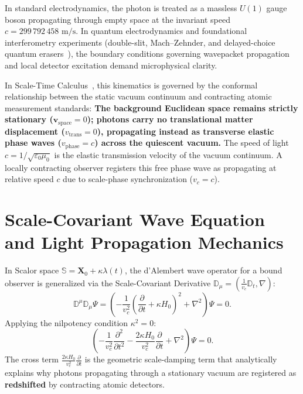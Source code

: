 \documentclass[11pt,a4paper]{article}
\begin{document}
In standard electrodynamics, the photon is treated as a massless $U(1)$ gauge boson propagating through empty space at the invariant speed $c = 299\,792\,458\text{ m/s}$. In quantum electrodynamics and foundational interferometry experiments (double-slit, Mach--Zehnder, and delayed-choice quantum erasers~\cite{scully1982,kim2000}), the boundary conditions governing wavepacket propagation and local detector excitation demand microphysical clarity.

In Scale-Time Calculus~\cite{scale_calculus}, this kinematics is governed by the conformal relationship between the static vacuum continuum and contracting atomic measurement standards: \textbf{The background Euclidean space remains strictly stationary ($\mathbf{v}_{\mathrm{space}} = 0$); photons carry no translational matter displacement ($v_{\mathrm{trans}} = 0$), propagating instead as transverse elastic phase waves ($v_{\mathrm{phase}} = c$) across the quiescent vacuum.} The speed of light $c = 1/\sqrt{\varepsilon_0\mu_0}$ is the elastic transmission velocity of the vacuum continuum. A locally contracting observer registers this free phase wave as propagating at relative speed $c$ due to scale-phase synchronization ($v_c = c$).

\section{Scale-Covariant Wave Equation and Light Propagation Mechanics}
\label{sec:dalga_denklemi}

In Scalor space $\mathbb{S} = \mathbf{X}_0 + \kappa \lambda(t)$, the d'Alembert wave operator for a bound observer is generalized via the Scale-Covariant Derivative $\mathbb{D}_\mu = (\frac{1}{v_c}\mathbb{D}_t, \nabla)$:
\begin{equation}
    \mathbb{D}^\mu \mathbb{D}_\mu \Psi = \left( -\frac{1}{v_c^2} \left(\frac{\partial}{\partial t} + \kappa H_0\right)^2 + \nabla^2 \right) \Psi = 0.
    \label{eq:dalga_op}
\end{equation}
Applying the nilpotency condition $\kappa^2 = 0$:
\begin{equation}
    \left( -\frac{1}{v_c^2} \frac{\partial^2}{\partial t^2} - \frac{2\kappa H_0}{v_c^2} \frac{\partial}{\partial t} + \nabla^2 \right) \Psi = 0.
    \label{eq:acik_dalga_tr}
\end{equation}
The cross term $\frac{2\kappa H_0}{v_c^2} \frac{\partial}{\partial t}$ is the geometric scale-damping term that analytically explains why photons propagating through a stationary vacuum are registered as \textbf{redshifted} by contracting atomic detectors.
\end{document}
